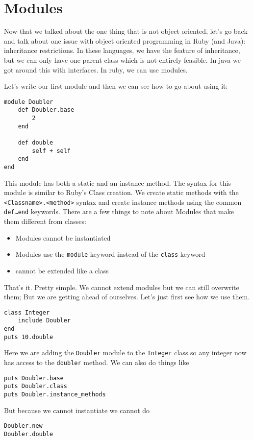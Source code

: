 \documentclass[main.tex]{subfiles}
\begin{document}
\section{Modules}

Now that we talked about the one thing that is not object oriented, let's go back and talk about one issue with object oriented programming in Ruby (and Java): inheritance restrictions.
In these languages, we have the feature of inheritance, but we can only have one parent class which is not entirely feasible. In java we got around this with interfaces. In ruby, we can use modules. 

Let's write our first module and then we can see how to go about using it:
\begin{lstlisting}[style=MyRubyStyle]
module Doubler
    def Doubler.base
        2
    end
    
    def double
        self + self
    end
end
\end{lstlisting}
This module has both a static and an instance method. The syntax for this module is similar to Ruby's Class creation. 
We create static methods with the \texttt{<Classname>.<method>} syntax and create instance methods using the common \texttt{def\dots end} keywords. There are a few things to note about Modules that make them different from classes:
\begin{itemize}
    \item Modules cannot be instantiated
    \item Modules use the \texttt{module} keyword instead of the \texttt{class} keyword
    \item cannot be extended like a class
\end{itemize}
That's it. Pretty simple. We cannot extend modules but we can still overwrite them; But we are getting ahead of ourselves. Let's just first see how we use them. 
\begin{lstlisting}[style=MyRubyStyle]
class Integer
    include Doubler
end
puts 10.double
\end{lstlisting}
Here we are adding the \texttt{Doubler} module to the \texttt{Integer} class so any integer now has access to the \texttt{doubler} method. 
We can also do things like
\begin{lstlisting}[style=MyRubyStyle]
puts Doubler.base
puts Doubler.class
puts Doubler.instance_methods
\end{lstlisting}
But because we cannot instantiate we cannot do
\begin{lstlisting}[style=MyRubyStyle]
Doubler.new
Doubler.double
\end{lstlisting}
\end{document}
